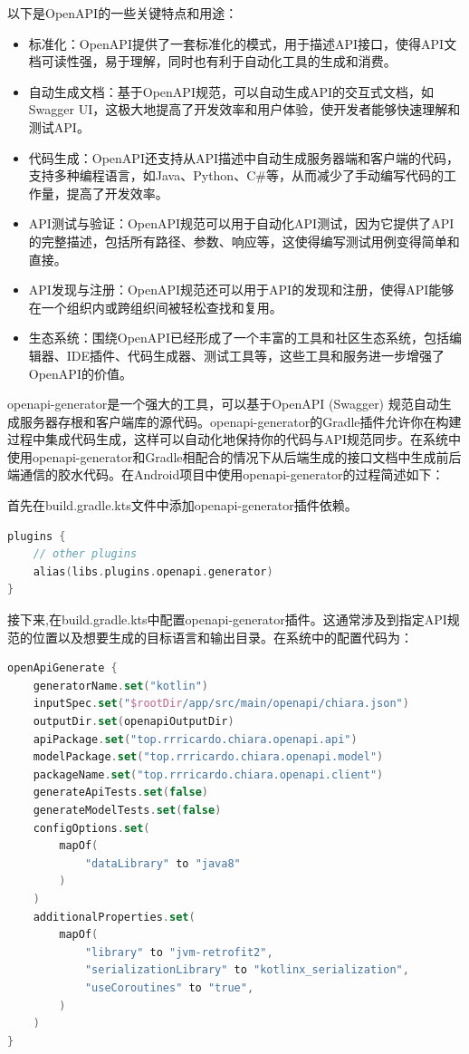 \documentclass[main.tex]{subfiles}
\begin{document}
以下是OpenAPI的一些关键特点和用途：
\begin{itemize}
    \item 标准化：OpenAPI提供了一套标准化的模式，用于描述API接口，使得API文档可读性强，易于理解，同时也有利于自动化工具的生成和消费。
    \item 自动生成文档：基于OpenAPI规范，可以自动生成API的交互式文档，如Swagger UI，这极大地提高了开发效率和用户体验，使开发者能够快速理解和测试API。
    \item 代码生成：OpenAPI还支持从API描述中自动生成服务器端和客户端的代码，支持多种编程语言，如Java、Python、C\#等，从而减少了手动编写代码的工作量，提高了开发效率。
    \item API测试与验证：OpenAPI规范可以用于自动化API测试，因为它提供了API的完整描述，包括所有路径、参数、响应等，这使得编写测试用例变得简单和直接。
    \item API发现与注册：OpenAPI规范还可以用于API的发现和注册，使得API能够在一个组织内或跨组织间被轻松查找和复用。
    \item 生态系统：围绕OpenAPI已经形成了一个丰富的工具和社区生态系统，包括编辑器、IDE插件、代码生成器、测试工具等，这些工具和服务进一步增强了OpenAPI的价值。
\end{itemize}

openapi-generator是一个强大的工具，可以基于OpenAPI (Swagger) 规范自动生成服务器存根和客户端库的源代码。openapi-generator的Gradle插件允许你在构建过程中集成代码生成，这样可以自动化地保持你的代码与API规范同步。在系统中使用openapi-generator和Gradle相配合的情况下从后端生成的接口文档中生成前后端通信的胶水代码。在Android项目中使用openapi-generator的过程简述如下：

首先在build.gradle.kts文件中添加openapi-generator插件依赖。

\begin{lstlisting}[language=Kotlin]
plugins {
    // other plugins
    alias(libs.plugins.openapi.generator)
}
\end{lstlisting}

接下来,在build.gradle.kts中配置openapi-generator插件。这通常涉及到指定API规范的位置以及想要生成的目标语言和输出目录。在系统中的配置代码为：

\begin{lstlisting}[language=Kotlin]
openApiGenerate {
    generatorName.set("kotlin")
    inputSpec.set("$rootDir/app/src/main/openapi/chiara.json")
    outputDir.set(openapiOutputDir)
    apiPackage.set("top.rrricardo.chiara.openapi.api")
    modelPackage.set("top.rrricardo.chiara.openapi.model")
    packageName.set("top.rrricardo.chiara.openapi.client")
    generateApiTests.set(false)
    generateModelTests.set(false)
    configOptions.set(
        mapOf(
            "dataLibrary" to "java8"
        )
    )
    additionalProperties.set(
        mapOf(
            "library" to "jvm-retrofit2",
            "serializationLibrary" to "kotlinx_serialization",
            "useCoroutines" to "true",
        )
    )
}
\end{lstlisting}
\end{document}
